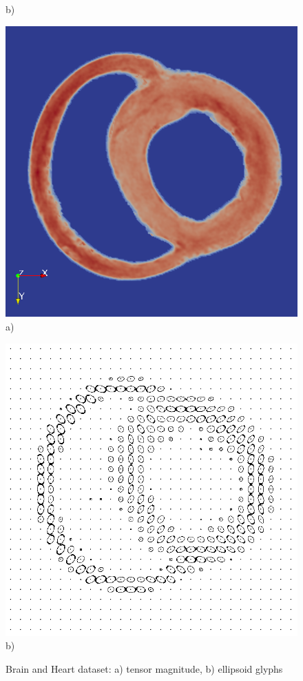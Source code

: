 \documentclass{scrartcl}
\begin{document}
\begin{figure}[!t]
\begin{minipage}{0.23\textwidth}
    \label{b)}
    b)
  \end{minipage}
  \begin{minipage}{0.23\textwidth}
  \centering
    \includegraphics[width=\textwidth]{heart_org.png}
    \label{b)}
    a)
  \end{minipage}
  \begin{minipage}{0.23\textwidth}
  \centering
    \includegraphics[width=\textwidth]{heartDwnsmpl.png}
    \label{b)}
    b)
  \end{minipage}
\caption{Brain and Heart dataset: a) tensor magnitude, b) ellipsoid glyphs}
\label{real1}
\end{figure}
\end{document}
